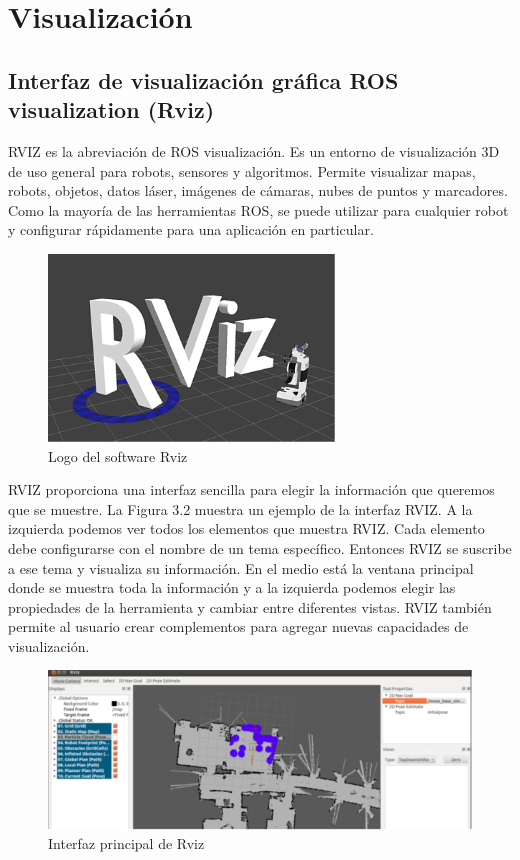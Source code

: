    
        \newpage    



\section{Visualización}
    
    \subsection{Interfaz de visualización gráfica ROS visualization (Rviz)}

        RVIZ es la abreviación de ROS visualización. Es un entorno de visualización 3D de uso general para robots, sensores y algoritmos. Permite visualizar mapas, robots, objetos, datos láser, imágenes de cámaras, nubes de puntos y marcadores.   Como la mayoría de las herramientas ROS, se puede utilizar para cualquier robot y configurar rápidamente para una aplicación en particular.
        
        \begin{figure}[htb]
            \centering
            \includegraphics[width=0.5\linewidth]{Main/Chapter3/Images3/3-6/logo-rviz.png}
            \caption{Logo del software Rviz}
            \label{f:Cap3-6_logo_rviz}
        \end{figure}
        
        RVIZ proporciona una interfaz sencilla para elegir la información que queremos que se muestre. La Figura 3.2 muestra un ejemplo de la interfaz RVIZ. A la izquierda podemos ver todos los elementos que muestra RVIZ. Cada elemento debe configurarse con el nombre de un tema específico. Entonces RVIZ se suscribe a ese tema y visualiza su información. En el medio está la ventana principal donde se muestra toda la información y a la izquierda podemos elegir las propiedades de la herramienta y cambiar entre diferentes vistas. RVIZ también permite al usuario crear complementos para agregar nuevas capacidades de visualización.
        
        \begin{figure}[htb]
            \centering
            \includegraphics[width=0.7\linewidth]{Main/Chapter3/Images3/3-6/interfaz-rviz.png}
            \caption{Interfaz principal de Rviz}
            \label{f:Cap3-6_interfaz_rviz}
        \end{figure}
        
